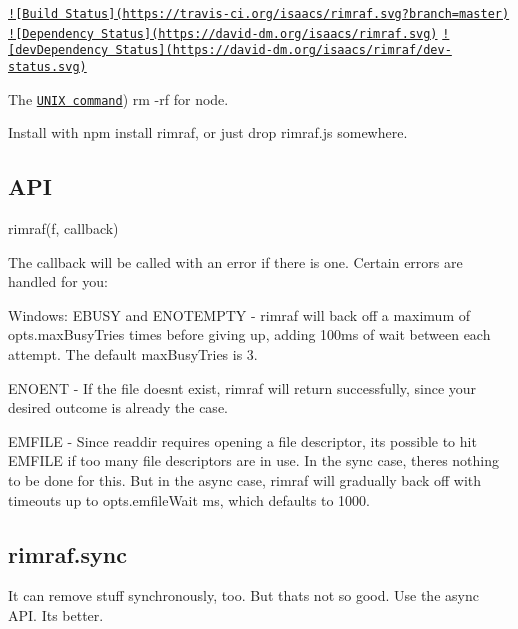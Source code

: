 \href{https://travis-ci.org/isaacs/rimraf}{\tt !\mbox{[}Build Status\mbox{]}(https\+://travis-\/ci.\+org/isaacs/rimraf.\+svg?branch=master)} \href{https://david-dm.org/isaacs/rimraf}{\tt !\mbox{[}Dependency Status\mbox{]}(https\+://david-\/dm.\+org/isaacs/rimraf.\+svg)} \href{https://david-dm.org/isaacs/rimraf#info=devDependencies}{\tt !\mbox{[}dev\+Dependency Status\mbox{]}(https\+://david-\/dm.\+org/isaacs/rimraf/dev-\/status.\+svg)}

The \href{http://en.wikipedia.org/wiki/Rm_(Unix}{\tt U\+N\+I\+X command}) {\ttfamily rm -\/rf} for node.

Install with {\ttfamily npm install rimraf}, or just drop rimraf.\+js somewhere.

\subsection*{A\+P\+I}

{\ttfamily rimraf(f, callback)}

The callback will be called with an error if there is one. Certain errors are handled for you\+:


\begin{DoxyItemize}
\item Windows\+: {\ttfamily E\+B\+U\+S\+Y} and {\ttfamily E\+N\+O\+T\+E\+M\+P\+T\+Y} -\/ rimraf will back off a maximum of {\ttfamily opts.\+max\+Busy\+Tries} times before giving up, adding 100ms of wait between each attempt. The default {\ttfamily max\+Busy\+Tries} is 3.
\item {\ttfamily E\+N\+O\+E\+N\+T} -\/ If the file doesn\textquotesingle{}t exist, rimraf will return successfully, since your desired outcome is already the case.
\item {\ttfamily E\+M\+F\+I\+L\+E} -\/ Since {\ttfamily readdir} requires opening a file descriptor, it\textquotesingle{}s possible to hit {\ttfamily E\+M\+F\+I\+L\+E} if too many file descriptors are in use. In the sync case, there\textquotesingle{}s nothing to be done for this. But in the async case, rimraf will gradually back off with timeouts up to {\ttfamily opts.\+emfile\+Wait} ms, which defaults to 1000.
\end{DoxyItemize}

\subsection*{rimraf.\+sync}

It can remove stuff synchronously, too. But that\textquotesingle{}s not so good. Use the async A\+P\+I. It\textquotesingle{}s better.


